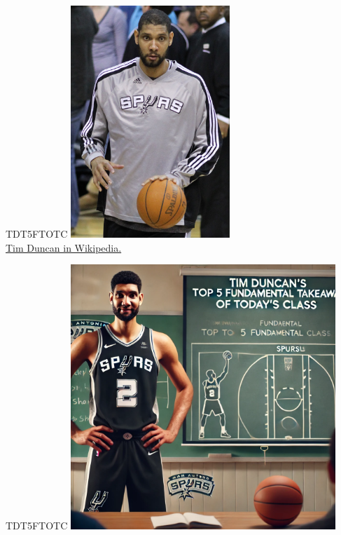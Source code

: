 \documentclass{beamer}
\begin{document}
\begin{frame}{TDT5FTOTC}
    \centering
    \includegraphics[width=0.45\textwidth]{figures/td.jpg}\\
    \href{https://en.wikipedia.org/wiki/Tim_Duncan}{Tim Duncan in Wikipedia.}
\end{frame}

\begin{frame}{TDT5FTOTC}
    \centering
    \includegraphics[width=0.75\textwidth]{figures/tim.png}
\end{frame}
\end{document}
